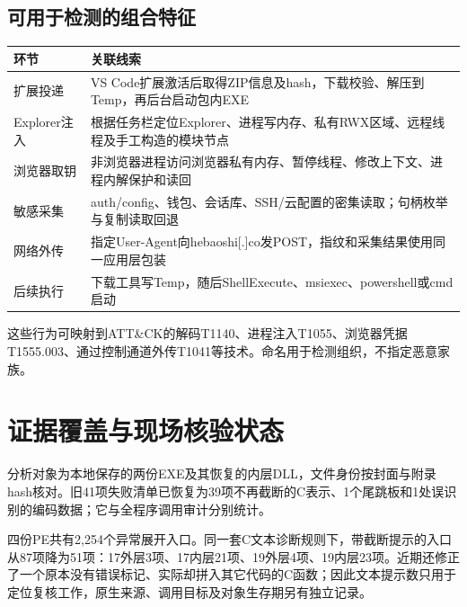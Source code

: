 \documentclass[UTF8,a4paper,zihao=5,fontset=windows]{ctexart}
\begin{document}
\subsection{可用于检测的组合特征}
\begin{longtable}{@{}L{31mm}L{119mm}@{}}\toprule 环节 & 关联线索\\\midrule\endhead
扩展投递 & VS Code扩展激活后取得ZIP信息及hash，下载校验、解压到Temp，再后台启动包内EXE\\
Explorer注入 & 根据任务栏定位Explorer、进程写内存、私有RWX区域、远程线程及手工构造的模块节点\\
浏览器取钥 & 非浏览器进程访问浏览器私有内存、暂停线程、修改上下文、进程内解保护和读回\\
敏感采集 & auth/config、钱包、会话库、SSH/云配置的密集读取；句柄枚举与复制读取回退\\
网络外传 & 指定User-Agent向hebaoshi[.]co发POST，指纹和采集结果使用同一应用层包装\\
后续执行 & 下载工具写Temp，随后ShellExecute、msiexec、powershell或cmd启动\\\bottomrule\end{longtable}

这些行为可映射到ATT\&CK的解码T1140、进程注入T1055、浏览器凭据T1555.003、通过控制通道外传T1041等技术。命名用于检测组织，不指定恶意家族。\cite{attack1140,attack1055,attack1555,attack1041}

\section{证据覆盖与现场核验状态}
\label{sec:status}
分析对象为本地保存的两份EXE及其恢复的内层DLL，文件身份按封面与附录hash核对。旧41项失败清单已恢复为39项不再截断的C表示、1个尾跳板和1处误识别的编码数据；它与全程序调用审计分别统计。

四份PE共有2,254个异常展开入口。同一套C文本诊断规则下，带截断提示的入口从87项降为51项：17外层3项、17内层21项、19外层4项、19内层23项。近期还修正了一个原本没有错误标记、实际却拼入其它代码的C函数；因此文本提示数只用于定位复核工作，原生来源、调用目标及对象生存期另有独立记录。
\end{document}
